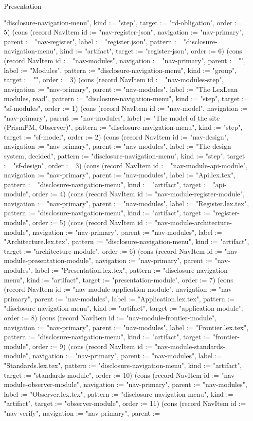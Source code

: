 \begin{lexlean}{Presentation}
\begin{semanticmodule}
{"disclosure-navigation-menu", kind := "step", target := "rd-obligation", order := 5}) (cons (record NavItem {id := "nav-register-json", navigation := "nav-primary", parent := "nav-register", label := "register.json", pattern := "disclosure-navigation-menu", kind := "artifact", target := "register-json", order := 6}) (cons (record NavItem {id := "nav-modules", navigation := "nav-primary", parent := "", label := "Modules", pattern := "disclosure-navigation-menu", kind := "group", target := "", order := 3}) (cons (record NavItem {id := "nav-modules-step", navigation := "nav-primary", parent := "nav-modules", label := "The LexLean modules, read", pattern := "disclosure-navigation-menu", kind := "step", target := "sf-modules", order := 1}) (cons (record NavItem {id := "nav-model", navigation := "nav-primary", parent := "nav-modules", label := "The model of the site (PrismPM, Observer)", pattern := "disclosure-navigation-menu", kind := "step", target := "sf-model", order := 2}) (cons (record NavItem {id := "nav-design", navigation := "nav-primary", parent := "nav-modules", label := "The design system, decided", pattern := "disclosure-navigation-menu", kind := "step", target := "sf-design", order := 3}) (cons (record NavItem {id := "nav-module-api-module", navigation := "nav-primary", parent := "nav-modules", label := "Api.lex.tex", pattern := "disclosure-navigation-menu", kind := "artifact", target := "api-module", order := 4}) (cons (record NavItem {id := "nav-module-register-module", navigation := "nav-primary", parent := "nav-modules", label := "Register.lex.tex", pattern := "disclosure-navigation-menu", kind := "artifact", target := "register-module", order := 5}) (cons (record NavItem {id := "nav-module-architecture-module", navigation := "nav-primary", parent := "nav-modules", label := "Architecture.lex.tex", pattern := "disclosure-navigation-menu", kind := "artifact", target := "architecture-module", order := 6}) (cons (record NavItem {id := "nav-module-presentation-module", navigation := "nav-primary", parent := "nav-modules", label := "Presentation.lex.tex", pattern := "disclosure-navigation-menu", kind := "artifact", target := "presentation-module", order := 7}) (cons (record NavItem {id := "nav-module-application-module", navigation := "nav-primary", parent := "nav-modules", label := "Application.lex.tex", pattern := "disclosure-navigation-menu", kind := "artifact", target := "application-module", order := 8}) (cons (record NavItem {id := "nav-module-frontier-module", navigation := "nav-primary", parent := "nav-modules", label := "Frontier.lex.tex", pattern := "disclosure-navigation-menu", kind := "artifact", target := "frontier-module", order := 9}) (cons (record NavItem {id := "nav-module-standards-module", navigation := "nav-primary", parent := "nav-modules", label := "Standards.lex.tex", pattern := "disclosure-navigation-menu", kind := "artifact", target := "standards-module", order := 10}) (cons (record NavItem {id := "nav-module-observer-module", navigation := "nav-primary", parent := "nav-modules", label := "Observer.lex.tex", pattern := "disclosure-navigation-menu", kind := "artifact", target := "observer-module", order := 11}) (cons (record NavItem {id := "nav-verify", navigation := "nav-primary", parent := }
\end{semanticmodule}
\end{lexlean}
